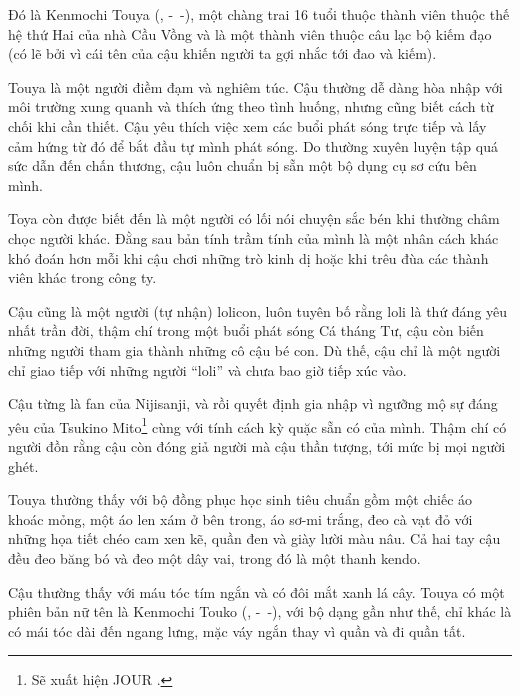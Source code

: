 \documentclass[../main.tex]{subfiles}
\begin{document}
\chrint

Đó là Kenmochi Touya (, -\ -), một chàng trai 16 tuổi thuộc thành viên thuộc thế hệ thứ Hai của nhà Cầu Vồng và là một thành viên thuộc câu lạc bộ kiếm đạo (có lẽ bởi vì cái tên của cậu khiến người ta gợi nhắc tới đao và kiếm).


Touya là một người điềm đạm và nghiêm túc. Cậu thường dễ dàng hòa nhập với môi trường xung quanh và thích ứng theo tình huống, nhưng cũng biết cách từ chối khi cần thiết. Cậu yêu thích việc xem các buổi phát sóng trực tiếp và lấy cảm hứng từ đó để bắt đầu tự mình phát sóng. Do thường xuyên luyện tập quá sức dẫn đến chấn thương, cậu luôn chuẩn bị sẵn một bộ dụng cụ sơ cứu bên mình.

Toya còn được biết đến là một người có lối nói chuyện sắc bén khi thường châm chọc người khác. Đằng sau bản tính trầm tính của mình là một nhân cách khác khó đoán hơn mỗi khi cậu chơi những trò kinh dị hoặc khi trêu đùa các thành viên khác trong công ty.

Cậu cũng là một người (tự nhận) lolicon, luôn tuyên bố rằng loli là thứ đáng yêu nhất trần đời, thậm chí trong một buổi phát sóng Cá tháng Tư, cậu còn biến những người tham gia thành những cô cậu bé con. Dù thế, cậu chỉ là một người chỉ giao tiếp với những người ``loli'' và chưa bao giờ tiếp xúc vào.

Cậu từng là fan của Nijisanji, và rồi quyết định gia nhập vì ngưỡng mộ sự đáng yêu của Tsukino Mito\footnote{Sẽ xuất hiện {\flaregothic JOUR }.} cùng với tính cách kỳ quặc sẵn có của mình. Thậm chí có người đồn rằng cậu còn đóng giả người mà cậu thần tượng, tới mức bị mọi người ghét.

Touya thường thấy với bộ đồng phục học sinh tiêu chuẩn gồm một chiếc áo khoác mỏng, một áo len xám ở bên trong, áo sơ-mi trắng, đeo cà vạt đỏ với những họa tiết chéo cam xen kẽ, quần đen và giày lười màu nâu. Cả hai tay cậu đều đeo băng bó và đeo một dây vai, trong đó là một thanh kendo.

Cậu thường thấy với máu tóc tím ngắn và có đôi mắt xanh lá cây. Touya có một phiên bản nữ tên là Kenmochi Touko (, -\ -), với bộ dạng gần như thế, chỉ khác là có mái tóc dài đến ngang lưng, mặc váy ngắn thay vì quần và đi quần tất.
\end{document}
